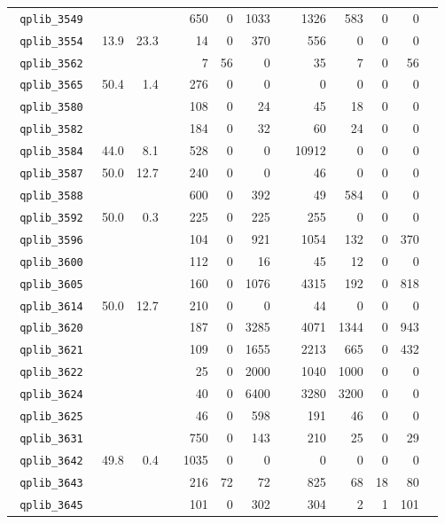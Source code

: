 {\begin{longtable}{lrrrrrrrrrrrr}
\texttt{ 	qplib\_3549	}	&		&		&	&	650	&	0	&	1033	&	&	1326	&	583	&	0	&	0	\\
\texttt{ 	qplib\_3554	}	&	13.9	&	23.3	&	&	14	&	0	&	370	&	&	556	&	0	&	0	&	0	\\
\texttt{ 	qplib\_3562	}	&		&		&	&	7	&	56	&	0	&	&	35	&	7	&	0	&	56	\\
\texttt{ 	qplib\_3565	}	&	50.4	&	1.4	&	&	276	&	0	&	0	&	&	0	&	0	&	0	&	0	\\
\texttt{ 	qplib\_3580	}	&		&		&	&	108	&	0	&	24	&	&	45	&	18	&	0	&	0	\\
\texttt{ 	qplib\_3582	}	&		&		&	&	184	&	0	&	32	&	&	60	&	24	&	0	&	0	\\
\texttt{ 	qplib\_3584	}	&	44.0	&	8.1	&	&	528	&	0	&	0	&	&	10912	&	0	&	0	&	0	\\
\texttt{ 	qplib\_3587	}	&	50.0	&	12.7	&	&	240	&	0	&	0	&	&	46	&	0	&	0	&	0	\\
\texttt{ 	qplib\_3588	}	&		&		&	&	600	&	0	&	392	&	&	49	&	584	&	0	&	0	\\
\texttt{ 	qplib\_3592	}	&	50.0	&	0.3	&	&	225	&	0	&	225	&	&	255	&	0	&	0	&	0	\\
\texttt{ 	qplib\_3596	}	&		&		&	&	104	&	0	&	921	&	&	1054	&	132	&	0	&	370	\\
\texttt{ 	qplib\_3600	}	&		&		&	&	112	&	0	&	16	&	&	45	&	12	&	0	&	0	\\
\texttt{ 	qplib\_3605	}	&		&		&	&	160	&	0	&	1076	&	&	4315	&	192	&	0	&	818	\\
\texttt{ 	qplib\_3614	}	&	50.0	&	12.7	&	&	210	&	0	&	0	&	&	44	&	0	&	0	&	0	\\
\texttt{ 	qplib\_3620	}	&		&		&	&	187	&	0	&	3285	&	&	4071	&	1344	&	0	&	943	\\
\texttt{ 	qplib\_3621	}	&		&		&	&	109	&	0	&	1655	&	&	2213	&	665	&	0	&	432	\\
\texttt{ 	qplib\_3622	}	&		&		&	&	25	&	0	&	2000	&	&	1040	&	1000	&	0	&	0	\\
\texttt{ 	qplib\_3624	}	&		&		&	&	40	&	0	&	6400	&	&	3280	&	3200	&	0	&	0	\\
\texttt{ 	qplib\_3625	}	&		&		&	&	46	&	0	&	598	&	&	191	&	46	&	0	&	0	\\
\texttt{ 	qplib\_3631	}	&		&		&	&	750	&	0	&	143	&	&	210	&	25	&	0	&	29	\\
\texttt{ 	qplib\_3642	}	&	49.8	&	0.4	&	&	1035	&	0	&	0	&	&	0	&	0	&	0	&	0	\\
\texttt{ 	qplib\_3643	}	&		&		&	&	216	&	72	&	72	&	&	825	&	68	&	18	&	80	\\
\texttt{ 	qplib\_3645	}	&		&		&	&	101	&	0	&	302	&	&	304	&	2	&	1	&	101	\\

\end{longtable}}
